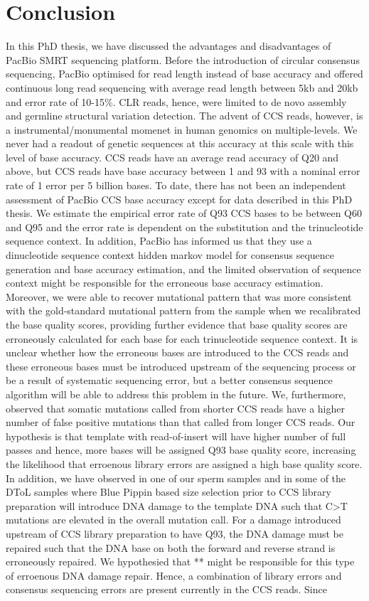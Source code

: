 \section{Conclusion}
In this PhD thesis, we have discussed the advantages and disadvantages of PacBio SMRT sequencing platform. Before the introduction of circular consensus sequencing, PacBio optimised for read length instead of base accuracy and offered continuous long read sequencing with average read length between 5kb and 20kb and error rate of 10-15\%. CLR reads, hence, were limited to de novo assembly and germline structural variation detection. The advent of CCS reads, however, is a instrumental/monumental momenet in human genomics on multiple-levels. We never had a readout of genetic sequences at this accuracy at this scale with this level of base accuracy. CCS reads have an average read accuracy of Q20 and above, but CCS reads have base accuracy between 1 and 93 with a nominal error rate of 1 error per 5 billion bases. To date, there has not been an independent assessment of PacBio CCS base accuracy except for data described in this PhD thesis. We estimate the empirical error rate of Q93 CCS bases to be between Q60 and Q95 and the error rate is dependent on the substitution and the trinucleotide sequence context. In addition, PacBio has informed us that they use a dinucleotide sequence context hidden markov model for consensus sequence generation and base accuracy estimation, and the limited observation of sequence context might be responsible for the erroneous base accuracy estimation. Moreover, we were able to recover mutational pattern that was more consistent with the gold-standard mutational pattern from the sample when we recalibrated the base quality scores, providing further evidence that base quality scores are erroneously calculated for each base for each trinucleotide sequence context. It is unclear whether how the erroneous bases are introduced to the CCS reads and these erroneous bases must be introduced upstream of the sequencing process or be a result of systematic sequencing error, but a better consensus sequence algorithm will be able to address this problem in the future. We, furthermore, observed that somatic mutations called from shorter CCS reads have a higher number of false positive mutations than that called from longer CCS reads. Our hypothesis is that template with read-of-insert will have higher number of full passes and hence, more bases will be assigned Q93 base quality score, increasing the likelihood that erroenous library errors are assigned a high base quality score. In addition, we have observed in one of our sperm samples and in some of the DToL samples where Blue Pippin based size selection prior to CCS library preparation will introduce DNA damage to the template DNA such that C>T mutations are elevated in the overall mutation call. For a damage introduced upstream of CCS library preparation to have Q93, the DNA damage must be repaired such that the DNA base on both the forward and reverse strand is erroneously repaired. We hypothesied that ** might be responsible for this type of erroenous DNA damage repair.  Hence, a combination of library errors and consensus sequencing errors are present currently in the CCS reads. Since 